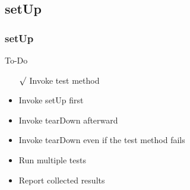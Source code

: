 \documentclass[lualatex]{beamer}
\begin{document}
\subsection{setUp}

\begin{frame}
  \frametitle{setUp}

  \begin{block}{To-Do}
    \begin{itemize}
    \item[$\surd$] Invoke test method
    \item Invoke setUp first 
    \item Invoke tearDown afterward 
    \item Invoke tearDown even if the test method fails 
    \item Run multiple tests 
    \item Report collected results 
    \end{itemize}
  \end{block}

\end{frame}
\end{document}

